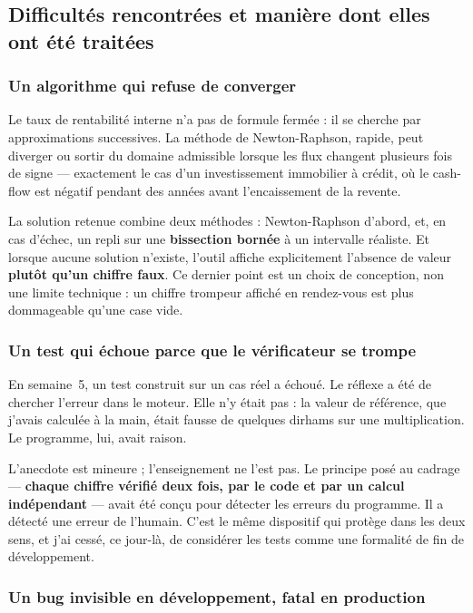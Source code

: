 \documentclass[12pt,a4paper]{article}
\begin{document}
\subsection{Difficultés rencontrées et manière dont elles ont été traitées}

\subsubsection{Un algorithme qui refuse de converger}

Le taux de rentabilité interne n'a pas de formule fermée : il se cherche par
approximations successives. La méthode de Newton-Raphson, rapide, peut diverger
ou sortir du domaine admissible lorsque les flux changent plusieurs fois de
signe --- exactement le cas d'un investissement immobilier à crédit, où le
cash-flow est négatif pendant des années avant l'encaissement de la revente.

La solution retenue combine deux méthodes : Newton-Raphson d'abord, et, en cas
d'échec, un repli sur une \textbf{bissection bornée} à un intervalle réaliste. Et
lorsque aucune solution n'existe, l'outil affiche explicitement l'absence de
valeur \textbf{plutôt qu'un chiffre faux}. Ce dernier point est un choix de
conception, non une limite technique : un chiffre trompeur affiché en rendez-vous
est plus dommageable qu'une case vide.

\subsubsection{Un test qui échoue parce que le vérificateur se trompe}

En semaine~5, un test construit sur un cas réel a échoué. Le réflexe a été de
chercher l'erreur dans le moteur. Elle n'y était pas : la valeur de référence,
que j'avais calculée à la main, était fausse de quelques dirhams sur une
multiplication. Le programme, lui, avait raison.

L'anecdote est mineure ; l'enseignement ne l'est pas. Le principe posé au
cadrage --- \textbf{chaque chiffre vérifié deux fois, par le code et par un
	calcul indépendant} --- avait été conçu pour détecter les erreurs du programme.
Il a détecté une erreur de l'humain. C'est le même dispositif qui protège dans
les deux sens, et j'ai cessé, ce jour-là, de considérer les tests comme une
formalité de fin de développement.

\subsubsection{Un bug invisible en développement, fatal en production}
\end{document}
